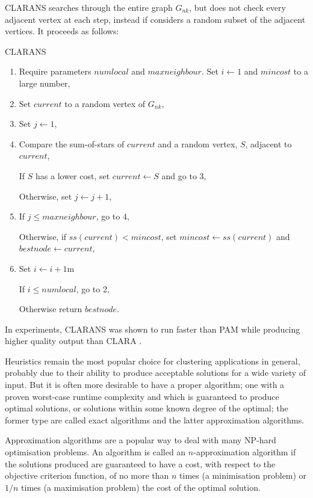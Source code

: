 \documentclass[a4paper]{report}
\begin{document}
CLARANS searches through the entire graph $G_{nk}$, but does not check every
adjacent vertex at each step, instead if considers a random subset of the
adjacent vertices.  It proceeds as follows:
\begin{algorithm}
  \caption{CLARANS}
  \begin{enumerate}
  \item Require parameters $numlocal$ and $maxneighbour$.  Set $i \gets 1$ and
    $mincost$ to a large number,
  \item Set $current$ to a random vertex of $G_{nk}$,
  \item Set $j \gets 1$,
  \item Compare the sum-of-stars of $current$ and a random vertex, $S$,
    adjacent to $current$,

    If $S$ has a lower cost, set $current \gets S$ and go to 3,

    Otherwise, set $j \gets j+1$,
  \item If $j \leq maxneighbour$, go to 4,

    Otherwise, if $ss(current)<mincost$, set $mincost \gets ss(current)$ and
    $bestnode \gets current$,
  \item Set $i \gets i+1$m

    If $i \leq numlocal$, go to 2,
  
    Otherwise return $bestnode$.
  \end{enumerate}
\end{algorithm}

In experiments, CLARANS was shown to run faster than PAM while producing
higher quality output than CLARA \citep{ng2002clarans}.

Heuristics remain the most popular choice for clustering applications in
general, probably due to their ability to produce acceptable solutions for a
wide variety of input.  But it is often more desirable to have a proper
algorithm; one with a proven worst-case runtime complexity and which is
guaranteed to produce optimal solutions, or solutions within some known degree
of the optimal; the former type are called exact algorithms and the latter
approximation algorithms.

Approximation algorithms are a popular way to deal with many NP-hard
optimisation problems.  An algorithm is called an $n$-approximation algorithm
if the solutions produced are guaranteed to have a cost, with respect to the
objective criterion function, of no more than $n$ times (a minimisation
problem) or $1/n$ times (a maximisation problem) the cost of the optimal
solution.
\end{document}
